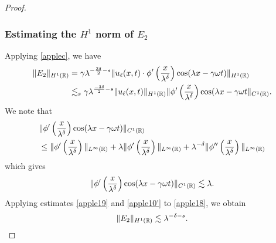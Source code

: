 \begin{proof}
\subsubsection{Estimating the $H^1$ norm of $\hyperref[all_errors_together]{E_2}$} Applying \eqref{applec}, we have
\begin{equation}
	\begin{split}
		\|E_2\|_{H^1(\mathbb{R})} 
		& = \gamma \lambda^{-\frac{3 \delta}{2} -s } \|u_\ell(x,t) \cdot
		\phi'\left( \frac{x}{\lambda^\delta} \right) \cos (\lambda x - \gamma \omega t)
		\|_{H^1(\mathbb{R})}
		\\
		& \lesssim_{s} \gamma \lambda^{\frac{-3 \delta}{2} -s } \|u_\ell(x,t) \|_{H^1(\mathbb{R})}
		\|\phi'\left( \frac{x}{\lambda^\delta} \right )
		\cos(\lambda x - \gamma \omega t 
		\|_{C^1(\mathbb{R})}.
		\label{apple18} 
	\end{split}
\end{equation}
We note that
\begin{equation*}
	\begin{split}
		& \|\phi'\left( \frac{x}{\lambda^\delta} \right) \cos(\lambda x - \gamma \omega t)
		\|_{C^1(\mathbb{R})}
		\\
		& \le \|\phi' \left( \frac{x}{\lambda^\delta} \right)\|_{L^\infty(\mathbb{R})} +
		\lambda \|\phi'\left( \frac{x}{\lambda^\delta} \right)\|_{L^\infty(\mathbb{R})}
		+ \lambda^{-\delta} \|\phi''\left( \frac{x}{\lambda^\delta} \right)
		\|_{L^\infty(\mathbb{R})}
	\end{split}
\end{equation*}
which gives
\begin{equation}
	\begin{split}
		\|\phi'\left( \frac{x}{\lambda^\delta} \right) \cos(\lambda x - \gamma \omega t)
		\|_{C^1(\mathbb{R})} \lesssim \lambda.
		\label{apple19}
	\end{split}
\end{equation}
Applying estimates \eqref{apple19} and \eqref{apple10'} to \eqref{apple18}, we obtain
\begin{equation*}
	\begin{split}
	\label{apple20}
	\|E_2\|_{H^1(\mathbb{R})} \lesssim \lambda^{-\delta -s }.
\end{split}
\end{equation*}
%
%
%
%

\end{proof}
